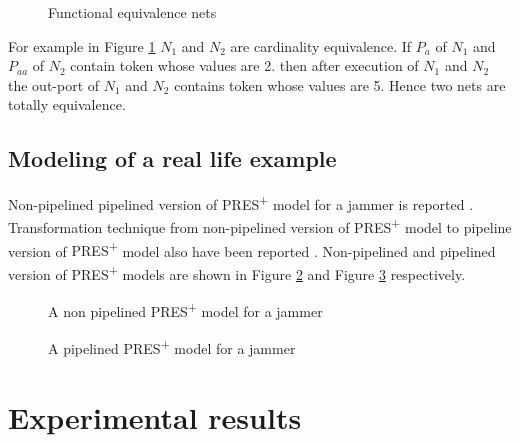 \documentclass[9pt,executive]{article}
\def\presp{PRES\textsuperscript{+}}
\def\presp{PRES\textsuperscript{+}}
\begin{document}
 \begin{figure}[htbp]
\centerline{}
\caption{Functional equivalence nets}
\label{fig:t}
\end{figure}
 For example in Figure \ref{fig:t} $N_1$ and $N_2$ are cardinality equivalence. If $P_a$ of $N_1$ and $P_{aa}$ of $N_2$ contain token whose values are 2.
then after execution of $N_1$ and $N_2$ the out-port of $N_1$ and $N_2$ contains token whose values are 5. Hence two nets are totally equivalence.


\subsection{Modeling of a real life example}
Non-pipelined pipelined version of {\presp} model for a jammer is reported \cite{zebo}. Transformation technique from non-pipelined version of {\presp} model 
to pipeline version of {\presp} model also have been reported \cite{zebo}.
Non-pipelined and pipelined version of {\presp} models are shown in  Figure \ref{fig:nonp} and Figure \ref{fig:papline} respectively.

 \begin{figure}[htbp]
\centerline{}
\caption{A non pipelined {\presp} model for a jammer}
\label{fig:nonp}
\end{figure}
\clearpage
\begin{figure}[htbp]
\centerline{}
\caption{A pipelined {\presp} model for a jammer}
\label{fig:papline}
\end{figure}
\section{Experimental results}\label{results}
\end{document}
